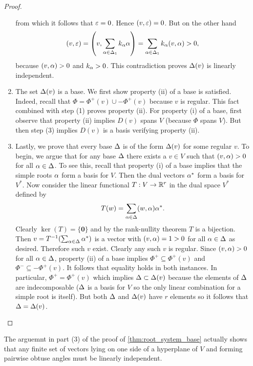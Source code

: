 \documentclass[12pt,reqno,oneside]{amsart}
\begin{document}
\begin{proof}
\begin{enumerate}
\[            \]
            from which it follows that $\varepsilon = 0$. Hence $(v,\varepsilon) = 0$. But on the other hand
            \[
                (v,\varepsilon) = \left(v,\sum_{\alpha \in \Delta_{1}}k_{\alpha}\alpha\right) = \sum_{\alpha \in \Delta_{1}}k_{\alpha}(v,\alpha) > 0,
            \]
            because $(v,\alpha) > 0$ and $k_{\alpha} > 0$. This contradiction proves $\Delta(v)$ is linearly independent.
            \item The set $\Delta(v)$ is a base. We first show property (ii) of a base is satisfied. Indeed, recall that $\Phi = \Phi^{+}(v) \cup -\Phi^{+}(v)$ because $v$ is regular. This fact combined with step (1) proves property (ii). For property (i) of a base, first observe that property (ii) implies $D(v)$ spans $V$ (because $\Phi$ spans $V$). But then step (3) implies $D(v)$ is a basis verifying property (ii).
            \item Lastly, we prove that every base $\Delta$ is of the form $\Delta(v)$ for some regular $v$. To begin, we argue that for any base $\Delta$ there exists a $v \in V$ such that $(v,\alpha) > 0$ for all $\alpha \in \Delta$. To see this, recall that property (i) of a base implies that the simple roots $\alpha$ form a basis for $V$. Then the dual vectors $\alpha^{\ast}$ form a basis for $V^{\ast}$. Now consider the linear functional $T:V \to \mathbb{R}^{r}$ in the dual space $V^{\ast}$ defined by
            \[
                T(w) = \sum_{\alpha \in \Delta}(w,\alpha)\alpha^{\ast}.
            \]
            Clearly $\ker(T) = \{\mathbf{0}\}$ and by the rank-nullity theorem $T$ is a bijection. Then $v = T^{-1}(\sum_{\alpha \in \Delta}\alpha^{\ast})$ is a vector with $(v,\alpha) = 1 > 0$ for all $\alpha \in \Delta$ as desired. Therefore such $v$ exist. Clearly any such $v$ is regular. Since $(v,\alpha) > 0$ for all $\alpha \in \Delta$, property (ii) of a base implies $\Phi^{+} \subseteq \Phi^{+}(v)$ and $\Phi^{-} \subseteq -\Phi^{+}(v)$. It follows that equality holds in both instances. In particular, $\Phi^{+} = \Phi^{+}(v)$ which implies $\Delta \subset \Delta(v)$ because the elements of $\Delta$ are indecomposable ($\Delta$ is a basis for $V$ so the only linear combination for a simple root is itself). But both $\Delta$ and $\Delta(v)$ have $r$ elements so it follows that $\Delta = \Delta(v)$.
        \end{enumerate}
    \end{proof}

    \begin{remark}\label{rem:obtuse_independence}
        The arguemnt in part (3) of the proof of \cref{thm:root_system_base} actually shows that any finite set of vectors lying on one side of a hyperplane of $V$ and forming pairwise obtuse angles must be linearly independent.
    \end{remark}
\end{document}

